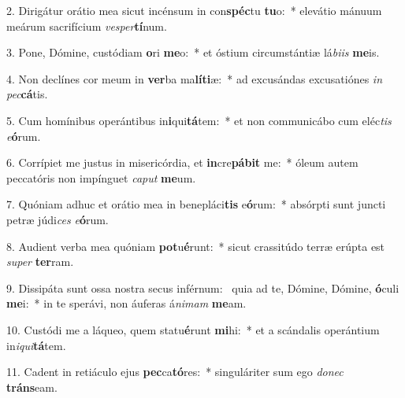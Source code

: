 2. Dirigátur orátio mea sicut incénsum in con\textbf{spéc}tu \textbf{tu}o:~*  elevátio mánuum meárum sacrifícium \textit{ves}\textit{per}\textbf{tí}num.\

3. Pone, Dómine, custódiam \textbf{o}ri \textbf{me}o:~*  et óstium circumstántiæ lá\textit{bi}\textit{is} \textbf{me}is.\

4. Non declínes cor meum in \textbf{ver}ba ma\textbf{lí}\textbf{ti}æ:~*  ad excusándas excusatiónes \textit{in} \textit{pec}\textbf{cá}tis.\

5. Cum homínibus operántibus in\textbf{i}qui\textbf{tá}tem:~*  et non communicábo cum eléc\textit{tis} \textit{e}\textbf{ó}rum.\

6. Corrípiet me justus in misericórdia, et \textbf{in}cre\textbf{pá}\textbf{bit} me:~*  óleum autem peccatóris non impínguet \textit{ca}\textit{put} \textbf{me}um.\

7. Quóniam adhuc et orátio mea in benepláci\textbf{tis} e\textbf{ó}rum:~*  absórpti sunt juncti petræ júdi\textit{ces} \textit{e}\textbf{ó}rum.\

8. Audient verba mea quóniam \textbf{pot}u\textbf{é}runt:~*  sicut crassitúdo terræ erúpta est \textit{su}\textit{per} \textbf{ter}ram.\

9. Dissipáta sunt ossa nostra secus inférnum: \dag\  quia ad te, Dómine, Dómine, \textbf{ó}culi \textbf{me}i:~*  in te sperávi, non áuferas á\textit{ni}\textit{mam} \textbf{me}am.\

10. Custódi me a láqueo, quem statu\textbf{é}runt \textbf{mi}hi:~*  et a scándalis operántium in\textit{i}\textit{qui}\textbf{tá}tem.\

11. Cadent in retiáculo ejus \textbf{pec}ca\textbf{tó}res:~*  singuláriter sum ego \textit{do}\textit{nec} \textbf{tráns}eam.\

